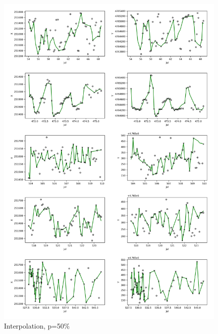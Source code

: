 \documentclass[11pt]{article}
\begin{document}
\begin{figure}[h]
  \centering
  \includegraphics[width=\textwidth]{../figure/50_5094_interpolation} %
  \caption{Interpolation, p=50\%}
  \label{fig: interpolation_50} %
\end{figure}
\end{document}
